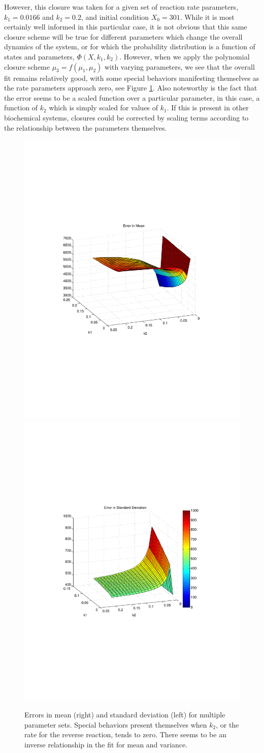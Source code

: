 \documentclass[a4paper,10pt]{article}
\begin{document}
However, this closure was taken for a given set of reaction rate parameters, $k_1=0.0166$ and $k_2=0.2$, and initial condition $X_0=301$. While it is most certainly well informed in this particular case, it is not obvious that this same closure scheme will be true for different parameters which change the overall dynamics of the system, or for which the probability distribution is a function of states and parameters, $\Phi(X,k_1,k_2)$. However, when we apply the polynomial closure scheme $\mu_3=f\left(\mu_1, \mu_2\right)$ with varying parameters, we see that the overall fit remains relatively good, with some special behaviors manifesting themselves as the rate parameters approach zero, see Figure \ref{errors}. Also noteworthy is the fact that the error seems to be a scaled function over a particular parameter, in this case, a function of $k_2$ which is simply scaled for values of $k_1$. If this is present in other biochemical systems, closures could be corrected by scaling terms according to the relationship between the parameters themselves.
\begin{figure}[h!]
 \includegraphics[width=.5\textwidth,height=.5\textwidth]{mean_errpr.pdf}
  \includegraphics[width=.5\textwidth,height=.5\textwidth]{std_error.pdf}
 \caption{Errors in mean (right) and standard deviation (left) for multiple parameter sets. Special behaviors present themselves when $k_2$, or the rate for the reverse reaction, tends to zero. There seems to be an inverse relationship in the fit for mean and variance.}
 \label{errors}
\end{figure}
\end{document}
